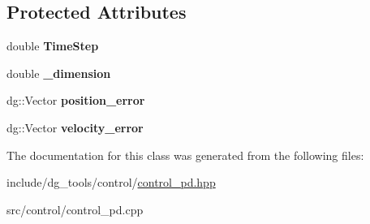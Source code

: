 \subsection*{Protected Attributes}
\begin{DoxyCompactItemize}
\item 
double {\bfseries Time\+Step}\hypertarget{classdynamicgraph_1_1sot_1_1PDController_a9043aaa176798471184f915d1d75d122}{}\label{classdynamicgraph_1_1sot_1_1PDController_a9043aaa176798471184f915d1d75d122}

\item 
double {\bfseries \+\_\+dimension}\hypertarget{classdynamicgraph_1_1sot_1_1PDController_ac2a7facafb80c1a41d825b2653eada59}{}\label{classdynamicgraph_1_1sot_1_1PDController_ac2a7facafb80c1a41d825b2653eada59}

\item 
dg\+::\+Vector {\bfseries position\+\_\+error}\hypertarget{classdynamicgraph_1_1sot_1_1PDController_af4779f470097a80de134de3f9e08433a}{}\label{classdynamicgraph_1_1sot_1_1PDController_af4779f470097a80de134de3f9e08433a}

\item 
dg\+::\+Vector {\bfseries velocity\+\_\+error}\hypertarget{classdynamicgraph_1_1sot_1_1PDController_ad8f0f65f4045b86d64517539580376a8}{}\label{classdynamicgraph_1_1sot_1_1PDController_ad8f0f65f4045b86d64517539580376a8}

\end{DoxyCompactItemize}


The documentation for this class was generated from the following files\+:\begin{DoxyCompactItemize}
\item 
include/dg\+\_\+tools/control/\hyperlink{control__pd_8hpp}{control\+\_\+pd.\+hpp}\item 
src/control/control\+\_\+pd.\+cpp\end{DoxyCompactItemize}
